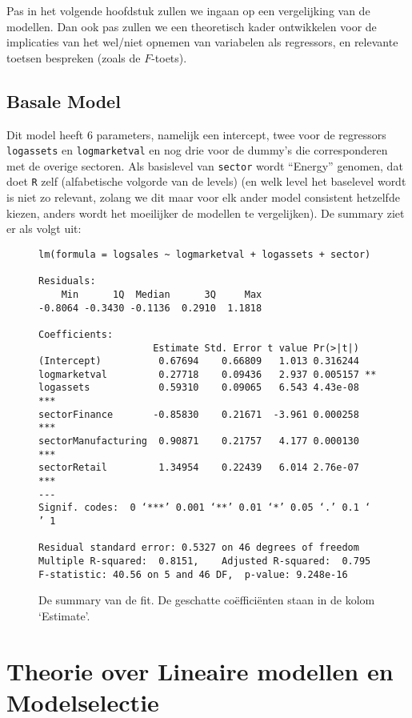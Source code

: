 \documentclass[a4paper]{report}
\begin{document}
  Pas in het volgende hoofdstuk zullen we ingaan op een vergelijking van de modellen. Dan ook pas zullen we een theoretisch kader ontwikkelen voor de implicaties van het wel/niet opnemen van variabelen als regressors, en relevante toetsen bespreken (zoals de $F$-toets).
  
\section{Basale Model}
\label{Basale Model}
  Dit model heeft 6 parameters, namelijk een intercept, twee voor de regressors \verb!logassets! en \verb!logmarketval! en nog drie voor de dummy's die corresponderen met de overige sectoren. Als basislevel van \verb!sector! wordt ``Energy'' genomen, dat doet \verb!R! zelf (alfabetische volgorde van de levels) (en welk level het baselevel wordt is niet zo relevant, zolang we dit maar voor elk ander model consistent hetzelfde kiezen, anders wordt het moeilijker de modellen te vergelijken). De summary ziet er als volgt uit:
  
  \begin{figure}[H]
  \begin{verbatim}
lm(formula = logsales ~ logmarketval + logassets + sector)

Residuals:
    Min      1Q  Median      3Q     Max 
-0.8064 -0.3430 -0.1136  0.2910  1.1818 

Coefficients:
                    Estimate Std. Error t value Pr(>|t|)    
(Intercept)          0.67694    0.66809   1.013 0.316244    
logmarketval         0.27718    0.09436   2.937 0.005157 ** 
logassets            0.59310    0.09065   6.543 4.43e-08 ***
sectorFinance       -0.85830    0.21671  -3.961 0.000258 ***
sectorManufacturing  0.90871    0.21757   4.177 0.000130 ***
sectorRetail         1.34954    0.22439   6.014 2.76e-07 ***
---
Signif. codes:  0 ‘***’ 0.001 ‘**’ 0.01 ‘*’ 0.05 ‘.’ 0.1 ‘ ’ 1

Residual standard error: 0.5327 on 46 degrees of freedom
Multiple R-squared:  0.8151,	Adjusted R-squared:  0.795 
F-statistic: 40.56 on 5 and 46 DF,  p-value: 9.248e-16
  \end{verbatim}
  \caption{De summary van de fit. De geschatte co\"effici\"enten staan in de kolom `Estimate'. }
  \end{figure}  

\chapter{Theorie over Lineaire modellen en Modelselectie}
\end{document}
